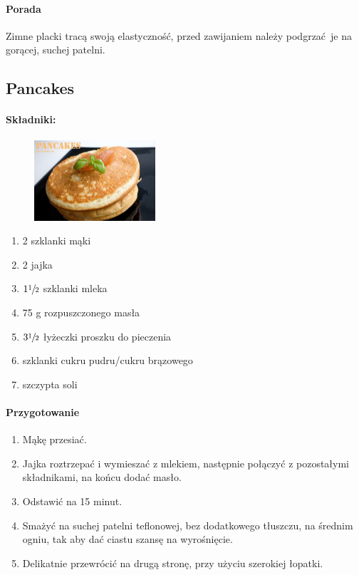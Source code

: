 \documentclass{article}
\begin{document}
    \paragraph{Porada}
    Zimne placki tracą swoją elastyczność, przed zawijaniem należy podgrzać je
    na gorącej, suchej patelni.
    \newpage

    \subsection{Pancakes}
    \bigskip
    \paragraph{Składniki:}
    \begin{figure}
        \includegraphics[width=0.4\textwidth]{pancakes.jpg}
    \end{figure}
    \begin{enumerate}
        \item 2 szklanki mąki
        \item 2 jajka
        \item $1\sfrac{1}{2}$ szklanki mleka
        \item 75 g rozpuszczonego masła
        \item $3\sfrac{1}{2}$ łyżeczki proszku do pieczenia
        \item {} szklanki cukru pudru/cukru brązowego
        \item szczypta soli
    \end{enumerate}

    \paragraph{Przygotowanie}
    \begin{enumerate}
        \item Mąkę przesiać.
        \item Jajka roztrzepać i wymieszać z mlekiem, następnie połączyć z
            pozostałymi składnikami, na końcu dodać masło.
        \item Odstawić na 15 minut.
        \item Smażyć na suchej patelni teflonowej, bez dodatkowego tłuszczu, na
            średnim ogniu, tak aby dać ciastu szansę na wyrośnięcie.
        \item Delikatnie przewrócić na drugą stronę, przy użyciu szerokiej
            łopatki.
    \end{enumerate}
    \newpage
\end{document}
